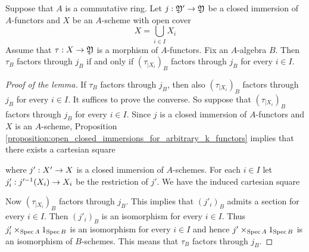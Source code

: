 \begin{lemma}\label{lemma:covers_and_factorizations}
Suppose that $A$ is a commutative ring. Let $j:{\mathfrak Y}'\rightarrow {\mathfrak Y}$ be a closed immersion of $A$-functors and $X$ be an $A$-scheme with open cover
$$X=\bigcup_{i\in I}X_i$$
Assume that $\tau:X\rightarrow {\mathfrak Y}$ is a morphism of $A$-functors. Fix an $A$-algebra $B$. Then $\tau_B$ factors through $j_B$ if and only if $\left(\tau_{\mid X_i}\right)_B$ factors through $j_B$ for every $i\in I$.
\end{lemma}
\begin{proof}[Proof of the lemma]
If $\tau_B$ factors through $j_B$, then also $\left(\tau_{\mid X_i}\right)_B$ factors through $j_B$ for every $i\in I$. It suffices to prove the converse. So suppose that $\left(\tau_{\mid X_i}\right)_B$ factors through $j_B$ for every $i\in I$. Since $j$ is a closed immersion of $A$-functors and $X$ is an $A$-scheme, Proposition \ref{proposition:open_closed_immersions_for_arbitrary_k_functors} implies that there exists a cartesian square
\begin{center}
\end{center}
where $j':X'\rightarrow X$ is a closed immersion of $A$-schemes. For each $i\in I$ let $j'_i:j'^{-1}(X_i)\rightarrow X_i$ be the restriction of $j'$. We have the induced cartesian square
\begin{center}
\end{center}
Now $\left(\tau_{\mid X_i}\right)_B$ factors through $j_B$. This implies that $(j'_i)_B$ admits a section for every $i\in I$. Then $(j'_i)_B$ is an isomorphism for every $i\in I$. Thus $j'_i\times_{\mathrm{Spec}\, A}1_{\mathrm{Spec}\, B}$ is an isomorphism for every $i\in I$ and hence $j'\times_{\mathrm{Spec}\, A}1_{\mathrm{Spec}\, B}$ is an isomorphism of $B$-schemes. This means that $\tau_B$ factors through $j_B$.
\end{proof}

